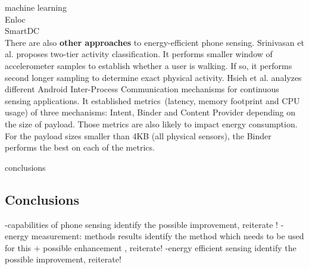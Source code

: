 machine learning\\
	Enloc \cite{constandache:enloc}\\
	SmartDC \cite{chon:smartdc}\\


There are also \textbf{other approaches} to energy-efficient phone sensing. Srinivasan et al. \cite{srinivasan:twotier} proposes two-tier activity classification. It performs smaller window of accelerometer samples to establish whether a user is walking. If  so, it performs second longer sampling to determine exact physical activity. Hsieh et al. \cite{hsieh:ipc} analyzes different Android Inter-Process Communication mechanisms for continuous sensing applications. It established metrics\ (latency, memory footprint and CPU usage) of three mechanisms: Intent, Binder and Content Provider depending on the size of payload. Those metrics are also likely to impact energy consumption. For the payload sizes smaller than 4KB (all physical sensors), the Binder performs the best on each of the metrics.

conclusions

\subsection{Conclusions}
-capabilities of phone sensing
	identify the possible improvement, reiterate !
-energy measurement:
	methods 
	results
	identify the method which needs to be used for this
		+ possible enhancement , reiterate!
-energy efficient sensing
	identify the possible improvement, reiterate!
